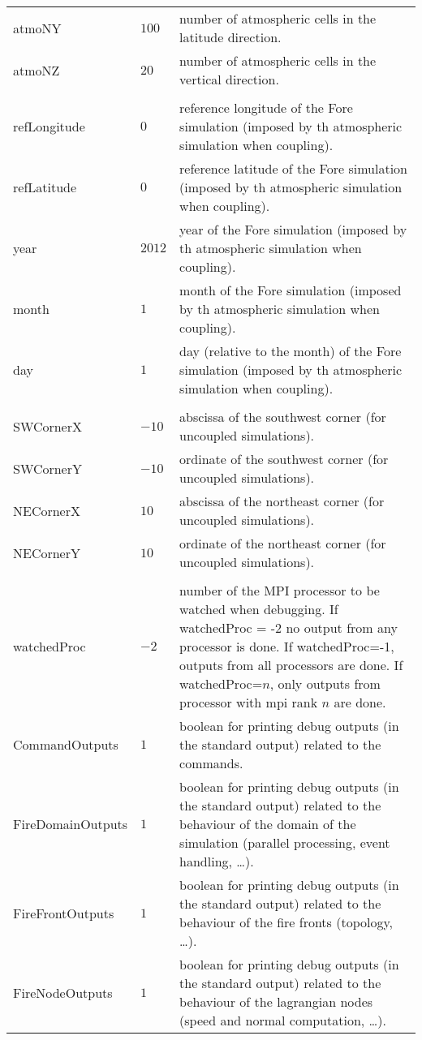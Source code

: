 \begin{center}
\begin{longtable}{|p{}|p{}|p{}|}
atmoNY & $100$ & number of atmospheric cells in the latitude direction. \\
atmoNZ & $20$ & number of atmospheric cells in the vertical direction. \\ \hline
 & & \\
refLongitude & $0$ & reference longitude of the Fore simulation (imposed by th atmospheric simulation when coupling). \\
refLatitude & $0$ & reference latitude of the Fore simulation (imposed by th atmospheric simulation when coupling). \\
year & $2012$ & year of the Fore simulation (imposed by th atmospheric simulation when coupling). \\
month & $1$ & month of the Fore simulation (imposed by th atmospheric simulation when coupling). \\
day & $1$ & day (relative to the month) of the Fore simulation (imposed by th atmospheric simulation when coupling). \\ \hline
 & & \\
SWCornerX & $-10$ & abscissa of the southwest corner (for uncoupled simulations). \\
SWCornerY & $-10$ & ordinate of the southwest corner (for uncoupled simulations). \\
NECornerX & $10$ & abscissa of the northeast corner (for uncoupled simulations). \\
NECornerY & $10$ & ordinate of the northeast corner (for uncoupled simulations). \\ \hline
 & & \\
watchedProc & $-2$ & number of the MPI processor to be watched when debugging. If watchedProc = -2 no output from any processor is done. If watchedProc=-1, outputs from all processors are done. If watchedProc=$n$, only outputs from processor with mpi rank $n$ are done. \\
CommandOutputs & $1$ & boolean for printing debug outputs (in the standard output) related to the commands. \\
FireDomainOutputs & $1$ & boolean for printing debug outputs (in the standard output) related to the behaviour of the domain of the simulation (parallel processing, event handling, \ldots). \\
FireFrontOutputs & $1$ & boolean for printing debug outputs (in the standard output) related to the behaviour of the fire fronts (topology, \ldots). \\
FireNodeOutputs & $1$ & boolean for printing debug outputs (in the standard output) related to the behaviour of the lagrangian nodes (speed and normal computation, \ldots). \\

\end{longtable}
\end{center}
